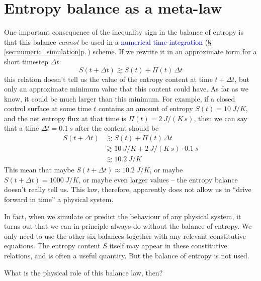 \documentclass[a4paper,12pt,%
onecolumn,oneside,%
british%
]{memoir}
\newcommand*{\incr}{\Delta}%
\renewcommand*{\|}[1][]{\nonscript\:#1\vert\nonscript\:\mathopen{}}
\newcommand*{\sect}{\S}%
\renewcommand*{\autoref}[3][\sect\,\ref]{\textcolor{blue}{#3} {\color{blue}\scriptsize(\faIcon[regular]{eye}\;#1{#2}\;p.\,\pageref{#2})}}
\newcommand*{\Dt}{\incr t}
\newcommand*{\yS}{S}
\newcommand*{\yB}{\varPi}
\begin{document}
\section{Entropy balance as a meta-law}
\label{sec:entropy_metalaw}

One important consequence of the inequality sign in the balance of entropy is that this balance \emph{cannot} be used in a \autoref{sec:numeric_simulation}{numerical time-integration} scheme. If we rewrite it in an approximate form for a short timestep $\Dt$:
\begin{equation*}
  \yS(t+\Dt) \gtrsim \yS(t) + \yB(t)\,\Dt
\end{equation*}
this relation doesn't tell us the value of the entropy content at time $t+\Dt$, but only an approximate minimum value that this content could have. As far as we know, it could be much larger than this minimum. For example, if a closed control surface at some time $t$ contains an amount of entropy $\yS(t) = \qty{10}{J/K}$, and the net entropy flux at that time is $\yB(t) = \qty{2}{J/(K\,s)}$, then we can say that a time $\Dt=\qty{0.1}{s}$ after the content should be
\begin{equation*}
  \begin{aligned}
    \yS(t+\Dt) &\gtrsim \yS(t) + \yB(t)\,\Dt\\
    &\gtrsim \qty{10}{J/K} + \qty{2}{J/(K\,s)}\cdot\qty{0.1}{s}\\
    &\gtrsim \qty{10.2}{J/K}
  \end{aligned}
\end{equation*}
This mean that maybe $\yS(t+\Dt) \approx \qty{10.2}{J/K}$, or maybe $\yS(t+\Dt)=\qty{1000}{J/K}$, or maybe even larger values -- the entropy balance doesn't really tell us. This law, therefore, apparently does not allow us to \enquote{drive forward in time} a physical system.

In fact, when we simulate or predict the behaviour of any physical system, it turns out that we can in principle always do without the balance of entropy. We only need to use the other six balances together with any relevant constitutive equations. The entropy content $\yS$ itself may appear in these constitutive relations, and is often a useful quantity. But the balance of entropy is not used.

What is the physical role of this balance law, then?

\medskip
\end{document}
